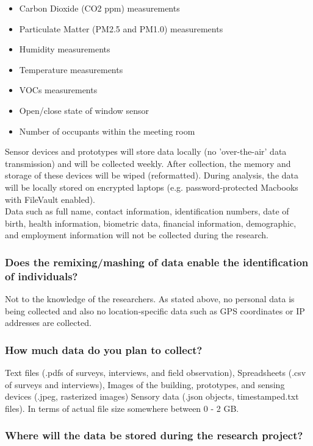 \documentclass[a4paper]{article}
\begin{document}
\begin{itemize}
  \item Carbon Dioxide (CO2 ppm) measurements 
  \item Particulate Matter (PM2.5 and PM1.0) measurements
  \item Humidity measurements
  \item Temperature measurements
  \item VOCs measurements
  \item Open/close state of window sensor
  \item Number of occupants within the meeting room
\end{itemize}

Sensor devices and prototypes will store data locally (no 'over-the-air' data transmission) and will be collected weekly. After collection, the memory and storage of these devices will be wiped (reformatted). During analysis, the data will be locally stored on encrypted laptops (e.g. password-protected Macbooks with FileVault enabled). \\

Data such as full name, contact information, identification numbers, date of birth, health information, biometric data, financial information, demographic, and employment information will not be collected during the research.

\subsubsection{Does the remixing/mashing of data enable the identification of individuals?}

Not to the knowledge of the researchers. As stated above, no personal data is being collected and also no location-specific data such as GPS coordinates or IP addresses are collected.


\subsubsection{How much data do you plan to collect?}

Text files (.pdfs of surveys, interviews, and field observation), Spreadsheets (.csv of surveys and interviews), Images of the building, prototypes, and sensing devices (.jpeg, rasterized images) Sensory data (.json objects, timestamped.txt files). In terms of actual file size somewhere between 0 - 2 GB.

\subsubsection{Where will the data be stored during the research project?}
\end{document}
